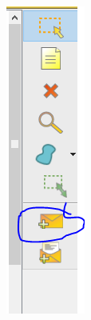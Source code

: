 \begin{center}
    \includegraphics[width=\linewidth]{images/04.debugging-rete/06.png}
\end{center}

